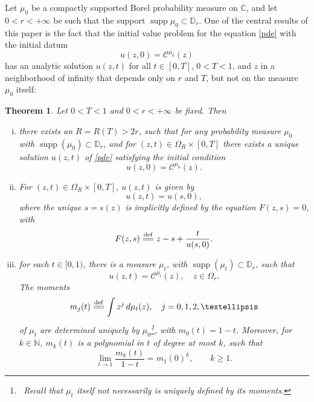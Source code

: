 \documentclass[reqno,11pt]{amsart}
\theoremstyle{plain}
\newtheorem{thm}{Theorem}[section]
\theoremstyle{definition}
\theoremstyle{remark}
\numberwithin{equation}{section}
\numberwithin{equation}{section}
\DeclareMathOperator{\supp}{supp}
\newcommand{\N}{\mathbb{N}}
\newcommand{\C}{\mathbb{C}}
\newcommand{\D}{\mathbb{D}}
\newcommand{\isdef}{\overset{\mathrm{def}}{=\joinrel=}}
\begin{document}
Let $\mu_0$ be a compactly supported Borel probability measure on $\C$, and let $0<r<+\infty$ be such that the support $\supp \mu_0 \subset \D_r$. One of the central results of this paper is the fact that the initial value problem for the equation \eqref{pde} with the initial datum
\begin{equation} \label{pdeInitial}
	u(z,0)=\mathcal C^{\mu_0}(z)
\end{equation}
has an analytic solution $u(z,t)$ for all $t\in [0, T]$, $0<T<1$, and $z$ in a neighborhood of infinity that depends only on $r$ and $T$, but not on the measure $\mu_0$ itself:
\begin{thm} \label{mainthm1}
	Let $0<T<1$ and $0<r<+\infty$ be fixed. Then 
	\begin{enumerate}[(i)]
		\item \label{item1Mainthm}there exists an $R=R(T)>2r$, such that for any probability  measure $\mu_0$ with $\supp(\mu_0) \subset \D_r$, and for $(z,t)\in \Omega_R \times [0,T] $ there exists a unique solution $u(z,t)$ of \eqref{pde} satisfying the initial condition 
		$$
		u(z, 0)= \mathcal C^{\mu_0}(z).
		$$
		\item \label{item2Mainthm} For $(z,t)\in \Omega_R \times [0,T] $, $u(z,t)$ is given  by
		\begin{equation} \label{charact1}
			u(z,t) = u (s, 0), 
		\end{equation}
		where the unique $s=s(z)$ is implicitly defined by the equation $F(z,s)=0$, with 
		\begin{equation} \label{charact1bis}
			F(z,s) \isdef 	z  -s+\frac{t}{u(s, 0)}.
		\end{equation}

		\item 
  \label{item3Mainthm} for each $t\in [0,1)$, there is a measure $\mu_t$, with $\supp(\mu_t) \subset\D_r$, such that
  \begin{equation}
      \label{u=Cauchy}
  u(z,t) =\mathcal C^{\mu_t}(z), \quad z \in \Omega_r.
  \end{equation}
  The moments
  \begin{equation}
      \label{u=moments}
  m_j(t) \isdef \int z^j \, d\mu_t(z), \quad j=0, 1, 2,\dots
  \end{equation}
  of $\mu_t$ are determined uniquely by $\mu_0$\footnote{\, Recall that $\mu_t$ itself not necessarily is uniquely defined by its moments.}, with $m_0(t)= 1-t$. Moreover, for $k\in \N$, $m_k(t)$ is a polynomial in $t$ of degree at most $k$, such that 
 \begin{equation}
     \label{limitMK}
\lim_{t\to 1} \frac{m_k(t)}{1-t}= m_1(0)^k, \qquad k\ge 1.
  \end{equation}
	\end{enumerate}
\end{thm}
\end{document}
